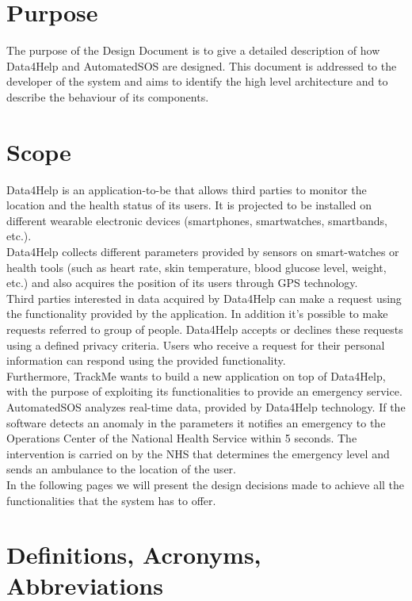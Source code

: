 \section{Purpose}
The purpose of the Design Document is to give a detailed description of how Data4Help and AutomatedSOS are designed. This document is addressed to the developer of the system and aims to identify the high level architecture and to describe the behaviour of its components.
\section{Scope}
Data4Help is an application-to-be that allows third parties to monitor the location and the health status of its users. It is projected to be installed on different wearable electronic devices (smartphones, smartwatches, smartbands, etc.).\\
Data4Help collects different parameters provided by sensors on smart-watches or health tools (such as heart rate, skin temperature, blood glucose level, weight, etc.) and also acquires the position of its users through GPS technology.\\
Third parties interested in data acquired by Data4Help can make a request using the functionality provided by the application. In addition it's possible to make requests referred to group of people. Data4Help accepts or declines these requests using a defined privacy criteria.
Users who receive a request for their personal information can respond using the provided functionality.\\
Furthermore, TrackMe wants to build a new application on top of Data4Help, with the purpose of exploiting its functionalities to provide an emergency service.\\
AutomatedSOS analyzes real-time data, provided by Data4Help technology.
If the software detects an anomaly in the parameters it notifies an emergency to the Operations Center of the National Health Service within 5 seconds. 
The intervention is carried on by the NHS that determines the emergency level and sends an ambulance to the location of the user.\\
In the following pages we will present the design decisions made to achieve all the functionalities that the system has to offer.


\section{Definitions, Acronyms, Abbreviations}
